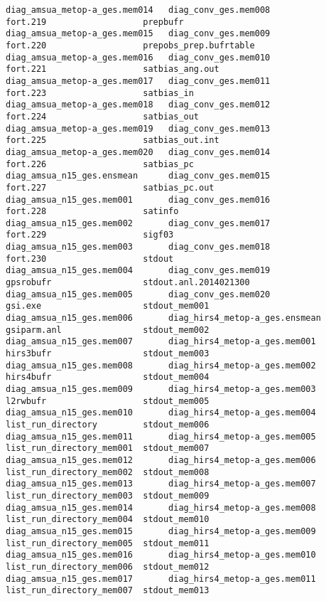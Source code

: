 \begin{scriptsize}
\begin{verbatim}
diag_amsua_metop-a_ges.mem014   diag_conv_ges.mem008            fort.219                   prepbufr
diag_amsua_metop-a_ges.mem015   diag_conv_ges.mem009            fort.220                   prepobs_prep.bufrtable
diag_amsua_metop-a_ges.mem016   diag_conv_ges.mem010            fort.221                   satbias_ang.out
diag_amsua_metop-a_ges.mem017   diag_conv_ges.mem011            fort.223                   satbias_in
diag_amsua_metop-a_ges.mem018   diag_conv_ges.mem012            fort.224                   satbias_out
diag_amsua_metop-a_ges.mem019   diag_conv_ges.mem013            fort.225                   satbias_out.int
diag_amsua_metop-a_ges.mem020   diag_conv_ges.mem014            fort.226                   satbias_pc
diag_amsua_n15_ges.ensmean      diag_conv_ges.mem015            fort.227                   satbias_pc.out
diag_amsua_n15_ges.mem001       diag_conv_ges.mem016            fort.228                   satinfo
diag_amsua_n15_ges.mem002       diag_conv_ges.mem017            fort.229                   sigf03
diag_amsua_n15_ges.mem003       diag_conv_ges.mem018            fort.230                   stdout
diag_amsua_n15_ges.mem004       diag_conv_ges.mem019            gpsrobufr                  stdout.anl.2014021300
diag_amsua_n15_ges.mem005       diag_conv_ges.mem020            gsi.exe                    stdout_mem001
diag_amsua_n15_ges.mem006       diag_hirs4_metop-a_ges.ensmean  gsiparm.anl                stdout_mem002
diag_amsua_n15_ges.mem007       diag_hirs4_metop-a_ges.mem001   hirs3bufr                  stdout_mem003
diag_amsua_n15_ges.mem008       diag_hirs4_metop-a_ges.mem002   hirs4bufr                  stdout_mem004
diag_amsua_n15_ges.mem009       diag_hirs4_metop-a_ges.mem003   l2rwbufr                   stdout_mem005
diag_amsua_n15_ges.mem010       diag_hirs4_metop-a_ges.mem004   list_run_directory         stdout_mem006
diag_amsua_n15_ges.mem011       diag_hirs4_metop-a_ges.mem005   list_run_directory_mem001  stdout_mem007
diag_amsua_n15_ges.mem012       diag_hirs4_metop-a_ges.mem006   list_run_directory_mem002  stdout_mem008
diag_amsua_n15_ges.mem013       diag_hirs4_metop-a_ges.mem007   list_run_directory_mem003  stdout_mem009
diag_amsua_n15_ges.mem014       diag_hirs4_metop-a_ges.mem008   list_run_directory_mem004  stdout_mem010
diag_amsua_n15_ges.mem015       diag_hirs4_metop-a_ges.mem009   list_run_directory_mem005  stdout_mem011
diag_amsua_n15_ges.mem016       diag_hirs4_metop-a_ges.mem010   list_run_directory_mem006  stdout_mem012
diag_amsua_n15_ges.mem017       diag_hirs4_metop-a_ges.mem011   list_run_directory_mem007  stdout_mem013

\end{verbatim}
\end{scriptsize}
